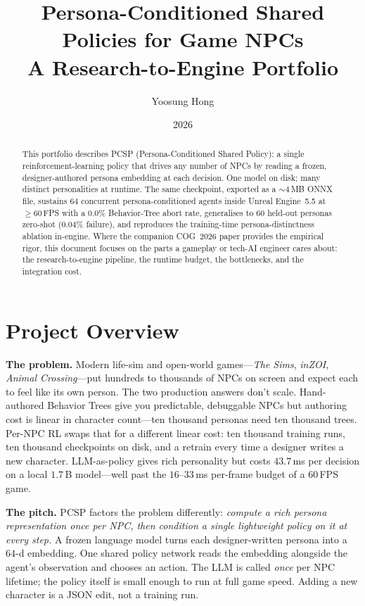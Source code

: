 \documentclass[11pt]{article}
\title{\textbf{Persona-Conditioned Shared Policies for Game NPCs}\\
       \large A Research-to-Engine Portfolio}
\author{Yoosung Hong}
\date{2026}
\newcommand{\PCSP}{PCSP}
\begin{document}
\maketitle

\begin{abstract}
This portfolio describes \PCSP{} (Persona-Conditioned Shared Policy):
a single reinforcement-learning policy that drives any number of NPCs
by reading a frozen, designer-authored persona embedding at each
decision. One model on disk; many distinct personalities at runtime.
The same checkpoint, exported as a $\sim\!4$\,MB ONNX file, sustains
$64$ concurrent persona-conditioned agents inside Unreal Engine~5.5 at
$\geq\!60$\,FPS with a $0.0\%$ Behavior-Tree abort rate, generalises to
$60$ held-out personas zero-shot ($0.04\%$ failure), and reproduces the
training-time persona-distinctness ablation in-engine. Where the
companion COG~2026 paper provides the empirical rigor, this document
focuses on the parts a gameplay or tech-AI engineer cares about: the
research-to-engine pipeline, the runtime budget, the bottlenecks, and
the integration cost.
\end{abstract}

\section{Project Overview}

\noindent\textbf{The problem.}
Modern life-sim and open-world games---\textit{The Sims},
\textit{inZOI}, \textit{Animal Crossing}---put hundreds to thousands of
NPCs on screen and expect each to feel like its own person. The two
production answers don't scale. Hand-authored Behavior Trees give you
predictable, debuggable NPCs but authoring cost is linear in character
count---ten thousand personas need ten thousand trees. Per-NPC RL
swaps that for a different linear cost: ten thousand training runs,
ten thousand checkpoints on disk, and a retrain every time a designer
writes a new character. LLM-as-policy gives rich personality but
costs $43.7$\,ms per decision on a local $1.7$\,B model---well past
the $16$--$33$\,ms per-frame budget of a 60\,FPS game.

\noindent\textbf{The pitch.}
\PCSP{} factors the problem differently: \emph{compute a rich persona
representation once per NPC, then condition a single lightweight policy
on it at every step.} A frozen language model turns each designer-written
persona into a $64$-d embedding. One shared policy network reads the
embedding alongside the agent's observation and chooses an action. The
LLM is called \emph{once} per NPC lifetime; the policy itself is small
enough to run at full game speed. Adding a new character is a JSON
edit, not a training run.
\end{document}
